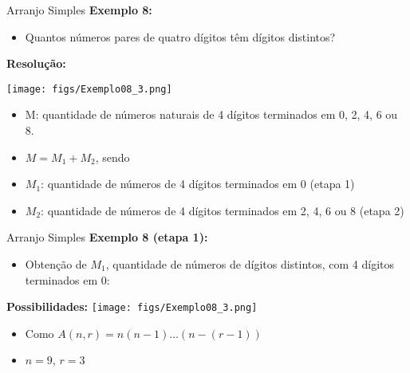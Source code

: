 \documentclass[aspectratio=169]{beamer}
\begin{document}
\begin{frame}{Arranjo Simples}
    \textbf{Exemplo 8:}

    \begin{itemize}
        \item[] Quantos números pares de quatro dígitos têm dígitos distintos?
    \end{itemize}

    \vspace{2mm}
    
    \textbf{Resolução:}
    
   \begin{center}
            \texttt{[image: figs/Exemplo08\_3.png]}
    \end{center}

    \pause
    \begin{itemize}
        \item[] M: quantidade de números naturais de 4 dígitos terminados em 0, 2, 4, 6 ou 8. \pause
        \item[] $M = M_1 + M_2$, sendo
        \item[] $M_1$: quantidade de números de 4 dígitos terminados em 0 (etapa 1)
        \item[] $M_2$: quantidade de números de 4 dígitos terminados em 2, 4, 6 ou 8 (etapa 2)
    \end{itemize}

\end{frame}

\begin{frame}{Arranjo Simples}
    \textbf{Exemplo 8 (etapa 1):}

    \begin{itemize}
        \item[] Obtenção de $M_1$, quantidade de números de dígitos distintos, com 4 dígitos terminados em 0:
    \end{itemize}

    \vspace{2mm}
    
    \pause
    \textbf{Possibilidades:} \hspace{1cm} \texttt{[image: figs/Exemplo08\_3.png]}
    
   \pause
    \begin{itemize}
        \item[] Como $A(n,r) = n(n-1) \ldots (n-(r-1))$
        \item[] \hspace{1cm} $n = 9$, $r = 3$
    \end{itemize}

\end{frame}
\end{document}
